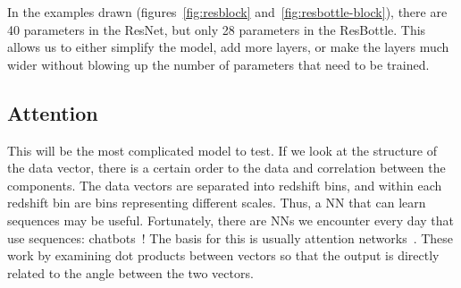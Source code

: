 In the examples drawn (figures~\ref{fig:resblock} and~\ref{fig:resbottle-block}), there are 40 parameters in the ResNet, but only 28 parameters in the ResBottle. This allows us to either simplify the model, add more layers, or make the layers much wider without blowing up the number of parameters that need to be trained.
\subsection{Attention}
This will be the most complicated model to test. If we look at the structure of the data vector, there is a certain order to the data and correlation between the components. The data vectors are separated into redshift bins, and within each redshift bin are bins representing different scales. Thus, a NN that can learn sequences may be useful. Fortunately, there are NNs we encounter every day that use sequences: chatbots~\cite{ruby_how_2023}! The basis for this is usually attention networks~\cite{vaswani_attention_2017}. These work by examining dot products between vectors so that the output is directly related to the angle between the two vectors.

